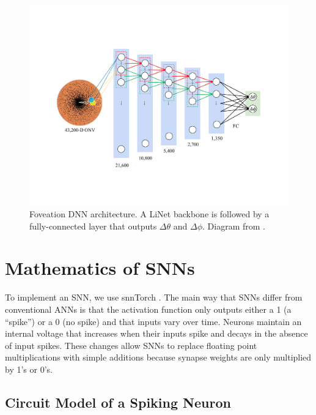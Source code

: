 \documentclass [MS] {UCLAthesis}
\begin{document}
\begin{figure}
\centering
\includegraphics[width=\linewidth,trim={25mm 40mm 30mm 40mm},clip]{linet}
\caption{Foveation DNN architecture. A LiNet backbone is followed by a fully-connected layer that outputs $\Delta\theta$ and $\Delta\phi$. Diagram from \citep{Arjun}.}
\label{fig:linet_foveation}
\end{figure}



\chapter{Mathematics of SNNs}
\label{appendix:snn}

To implement an SNN, we use snnTorch \citep{snnTorch}. The main way that SNNs differ from conventional ANNs is that the activation function only outputs either a 1 (a ``spike'') or a 0 (no spike) and that inputs vary over time. Neurons maintain an internal voltage that increases when their inputs spike and decays in the absence of input spikes. These changes allow SNNs to replace floating point multiplications with simple additions because synapse weights are only multiplied by 1's or 0's.


\section{Circuit Model of a Spiking Neuron}
\label{sec:derivation}
\end{document}
